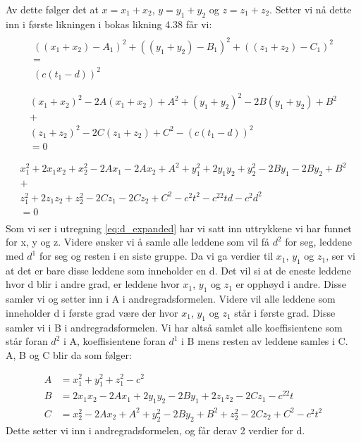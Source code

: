 Av dette følger det at $x=x_1+x_2$, $y=y_1+y_2$ og $z=z_1+z_2$. Setter vi nå dette inn i første likningen i bokas likning 4.38 får vi: 
\begin{multline}
	\\
    ((x_1+x_2)-A_1)^2+((y_1+y_2)-B_1)^2+((z_1+z_2)-C_1)^2\\
    =\\
    (c(t_1-d))^2 \\\nonumber
\end{multline}
\begin{multline}
	\\
  (x_1+x_2)^2-2A(x_1+x_2)+A^2+(y_1+y_2)^2-2B(y_1+y_2)+B^2\\
    +\\
    (z_1+z_2)^2-2C(z_1+z_2)+C^2-(c(t_1-d))^2\\
    =0 \nonumber 	\\
\end{multline}
\begin{multline}\label{eq:d_expanded}
    \\
    x_1^2+2x_1x_2+x_2^2-2Ax_1-2Ax_2+A^2+y_1^2+2y_1y_2+y_2^2-2By_1-2By_2+B^2\\
    +\\
    z_1^2+2z_1z_2+z_2^2-2Cz_1-2Cz_2+C^2-c^2t^2-c^22td-c^2d^2 \\
    = 0\\
\end{multline}
Som vi ser i utregning \ref{eq:d_expanded} har vi satt inn uttrykkene vi har funnet for x, y og z. Videre ønsker vi å samle alle leddene som vil få $d^2$ for seg, leddene med $d^1$ for seg og resten i en siste gruppe. Da vi ga verdier til $x_1$, $y_1$ og $z_1$, ser vi at det er bare disse leddene som inneholder en d. Det vil si at de eneste leddene hvor d blir i andre grad, er leddene hvor $x_1$, $y_1$ og $z_1$ er opphøyd i andre. Disse samler vi og setter inn i A i andregradsformelen. Videre vil alle leddene som inneholder d i første grad være der hvor $x_1$, $y_1$ og $z_1$ står i første grad. Disse samler vi i B i andregradsformelen. Vi har altså samlet alle koeffisientene som står foran $d^2$ i A, koeffisientene foran $d^1$ i B mens resten av leddene samles i C. A, B og C blir da som følger: 

\begin{align}
    A&=x_1^2+y_1^2+z_1^2-c^2 \\
    B&=2x_1x_2-2Ax_1+2y_1y_2-2By_1+2z_1z_2-2Cz_1-c^22t\\
    C&=x_2^2-2Ax_2+A^2+y_2^2-2By_2+B^2+z_2^2-2Cz_2+C^2-c^2t^2
\end{align}
Dette setter vi inn i andregradsformelen, og får derav 2 verdier for d. 

